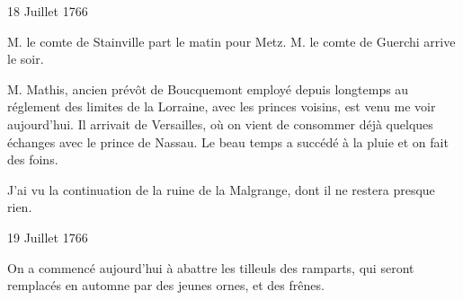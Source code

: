                      \begin{diary}{18 Juillet 1766}{}


                           M. le comte de Stainville part le
                           matin
                           pour Metz. M. le comte de Guerchi
                           arrive le soir. \bigskip



                           M. Mathis, ancien prévôt de
                              Boucquemont
                           employé depuis longtemps au réglement des
                           limites de la Lorraine, avec
                           les princes
                           voisins, est venu me voir aujourd'hui. Il
                           arrivait de Versailles,
                           où on vient de consommer
                           déjà quelques échanges avec le prince
                              de
                              Nassau. Le beau temps a succédé à la pluie
                           et on fait des foins. \bigskip


                         J'ai vu la continuation de la ruine
                           de
                           la Malgrange, dont il ne restera
                           presque rien. \bigskip


                     \end{diary}

                     \begin{diary}{19 Juillet 1766}{}

                         On a commencé aujourd'hui à abattre les
                           tilleuls des ramparts, qui seront remplacés
                           en automne par des jeunes ornes, et des frênes. \bigskip


                     \end{diary}

